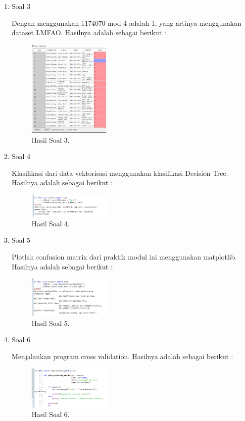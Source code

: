 \begin{enumerate}
	\item Soal 3
	\hfill\break
	
	Dengan menggunakan 1174070 mod 4 adalah 1, yang artinya menggunakan dataset LMFAO. Hasilnya adalah sebagai berikut :
	\begin{figure}[H]
	\centering
		\includegraphics[width=4cm]{figures/1174070/4/materi/hasil31.PNG}
		\caption{Hasil Soal 3.}
	\end{figure}

	\item Soal 4
	\hfill\break
	
	Klasifikasi dari data vektorisasi menggunakan klasifikasi Decision Tree. Hasilnya adalah sebagai berikut :
	\begin{figure}[H]
	\centering
		\includegraphics[width=4cm]{figures/1174070/4/materi/hasil4.PNG}
		\caption{Hasil Soal 4.}
	\end{figure}

	\item Soal 5
	\hfill\break
	
	Plotlah confusion matrix dari praktik modul ini menggunakan matplotlib. Hasilnya adalah sebagai berikut :
	\begin{figure}[H]
	\centering
		\includegraphics[width=4cm]{figures/1174070/4/materi/hasil5.PNG}
		\caption{Hasil Soal 5.}
	\end{figure}

	\item Soal 6
	\hfill\break
	
	Menjalankan program cross validation. Hasilnya adalah sebagai berikut :
	\begin{figure}[H]
	\centering
		\includegraphics[width=4cm]{figures/1174070/4/materi/hasil6.PNG}
		\caption{Hasil Soal 6.}
	\end{figure}


\end{enumerate}
